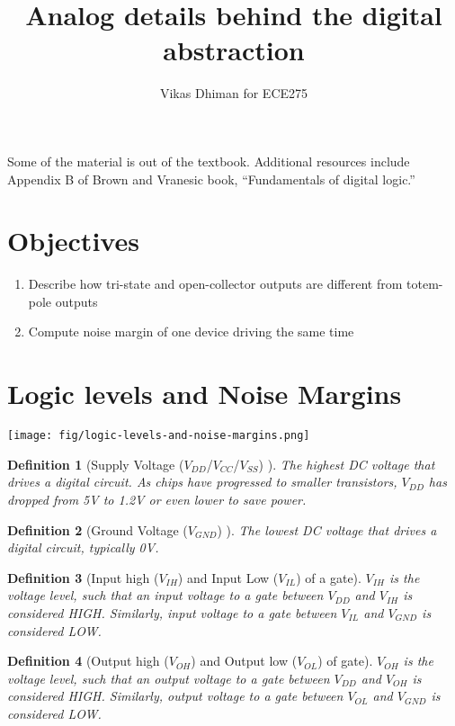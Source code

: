 \documentclass{article}
\author{Vikas Dhiman for ECE275}
\title{Analog details behind the digital abstraction}
\newtheorem{definition}{Definition}
\newcommand{\notescol}{white}
\begin{document}
\maketitle

Some of the material is out of the textbook. Additional resources include
Appendix B of Brown and Vranesic book, ``Fundamentals of digital logic.''

\section{Objectives}
\begin{enumerate}
\item Describe how tri-state and open-collector outputs are different from totem-pole outputs
\item Compute noise margin of one device driving the same time
\end{enumerate}

\section{Logic levels and Noise Margins}

\texttt{[image: fig/logic-levels-and-noise-margins.png]}

\begin{definition}[Supply Voltage ($V_{DD}$/$V_{CC}$/$V_{SS}$) ]
  \color{\notescol}
  The highest DC voltage that drives a digital circuit. As chips have progressed
  to smaller transistors, $V_{DD}$ has dropped from 5V to 1.2V or even lower to
  save power.
\end{definition}

\begin{definition}[Ground Voltage ($V_{GND}$) ]
  \color{\notescol}
  The lowest DC voltage that drives a digital circuit, typically 0V.
\end{definition}

\begin{definition}[Input high ($V_{IH}$) and Input Low ($V_{IL}$) of a gate]
  \color{\notescol}
  $V_{IH}$ is the voltage level, such that an input voltage to a gate between $V_{DD}$
  and $V_{IH}$ is considered \emph{HIGH}. Similarly, input voltage to a gate
  between $V_{IL}$ and $V_{GND}$ is considered \emph{LOW}.
\end{definition}

\begin{definition}[Output high ($V_{OH}$) and Output low ($V_{OL}$) of gate]
  \color{\notescol}
  $V_{OH}$ is the voltage level, such that an output voltage to a gate between $V_{DD}$
  and $V_{OH}$ is considered \emph{HIGH}. Similarly, output voltage to a gate
  between $V_{OL}$ and $V_{GND}$ is considered \emph{LOW}.
\end{definition}
\end{document}
